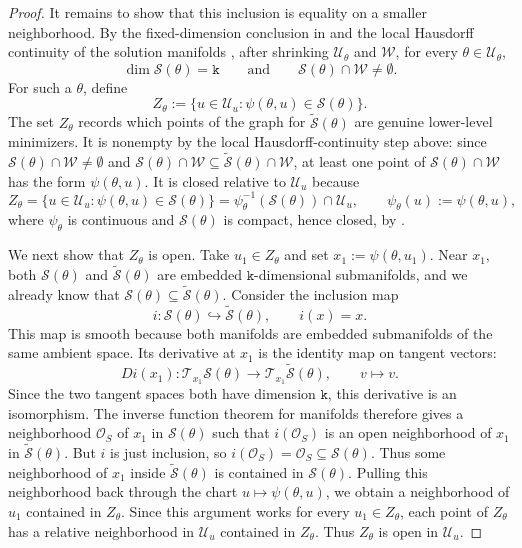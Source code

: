\documentclass{article}
\theoremstyle{normaltheorem}
\newcommand{\dimk}{\texttt{k}}
\newcommand{\calS}{\mathcal{S}}
\newcommand{\calT}{\mathcal{T}}
\begin{document}
\begin{proof}
		It remains to show that this inclusion is equality on a smaller neighborhood. By the fixed-dimension conclusion in
		 and the local Hausdorff continuity of the solution manifolds
		\citep[Lem.~3.2]{masiha2025superquantile}, after shrinking \(\mathcal U_\theta\) and \(\mathcal W\), for every
		\(\theta\in\mathcal U_\theta\),
		\[
		\dim\calS(\theta)=\dimk
		\qquad\text{and}\qquad
		\calS(\theta)\cap\mathcal W\neq\emptyset .
		\]
		For such a \(\theta\), define
		\[
		Z_\theta:=\{u\in\mathcal U_u:\psi(\theta,u)\in\calS(\theta)\}.
		\]
		The set \(Z_\theta\) records which points of the graph for \(\widetilde{\calS}(\theta)\) are genuine lower-level
		minimizers. It is nonempty by the local Hausdorff-continuity step above: since
		\(\calS(\theta)\cap\mathcal W\neq\emptyset\) and
		\(\calS(\theta)\cap\mathcal W\subseteq\widetilde{\calS}(\theta)\cap\mathcal W\), at least one point of
		\(\calS(\theta)\cap\mathcal W\) has the form \(\psi(\theta,u)\). It is closed relative to \(\mathcal U_u\) because
		\[
		Z_\theta=\{u\in\mathcal U_u:\psi(\theta,u)\in\calS(\theta)\}
		=
		\psi_\theta^{-1}(\calS(\theta))\cap\mathcal U_u,
		\qquad \psi_\theta(u):=\psi(\theta,u),
		\]
		where \(\psi_\theta\) is continuous and \(\calS(\theta)\) is compact, hence closed, by .

		We next show that \(Z_\theta\) is open. Take \(u_1\in Z_\theta\) and set \(x_1:=\psi(\theta,u_1)\). Near \(x_1\),
		both \(\calS(\theta)\) and \(\widetilde{\calS}(\theta)\) are embedded \(\dimk\)-dimensional submanifolds, and we already
		know that \(\calS(\theta)\subseteq\widetilde{\calS}(\theta)\). Consider the inclusion map
		\[
		i:\calS(\theta)\hookrightarrow\widetilde{\calS}(\theta),\qquad i(x)=x.
		\]
		This map is smooth because both manifolds are embedded submanifolds of the same ambient space. Its derivative at
		\(x_1\) is the identity map on tangent vectors:
		\[
		D i(x_1):\calT_{x_1}\calS(\theta)\to \calT_{x_1}\widetilde{\calS}(\theta),\qquad v\mapsto v.
		\]
		Since the two tangent spaces both have dimension \(\dimk\), this derivative is an isomorphism. The inverse function
		theorem for manifolds therefore gives a neighborhood \(\mathcal O_S\) of \(x_1\) in \(\calS(\theta)\) such that
		\(i(\mathcal O_S)\) is an open neighborhood of \(x_1\) in \(\widetilde{\calS}(\theta)\). But \(i\) is just inclusion,
		so \(i(\mathcal O_S)=\mathcal O_S\subseteq\calS(\theta)\). Thus some neighborhood of \(x_1\) inside
		\(\widetilde{\calS}(\theta)\) is contained in \(\calS(\theta)\). Pulling this neighborhood back through the chart
		\(u\mapsto\psi(\theta,u)\), we obtain a neighborhood of \(u_1\) contained in \(Z_\theta\). Since this argument works
		for every \(u_1\in Z_\theta\), each point of \(Z_\theta\) has a relative neighborhood in \(\mathcal U_u\) contained in
		\(Z_\theta\). Thus \(Z_\theta\) is open in \(\mathcal U_u\).


\end{proof}
\end{document}
